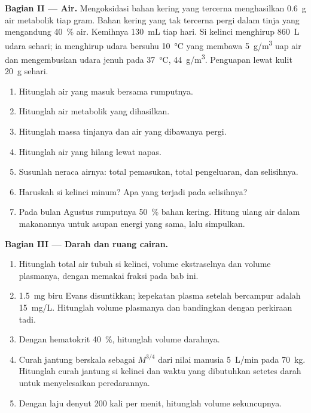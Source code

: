 \begin{problem}
\medskip
\noindent\textbf{Bagian II --- Air.}
Mengoksidasi bahan kering yang tercerna menghasilkan \qty{0.6}{g} air
metabolik tiap gram. Bahan kering yang tak tercerna pergi dalam tinja
yang mengandung \qty{40}{\%} air. Kemihnya \qty{130}{mL} tiap hari. Si
kelinci menghirup \qty{860}{L} udara sehari; ia menghirup udara
bersuhu \qty{10}{\celsius} yang membawa \qty{5}{g/m^3} uap air dan
mengembuskan udara jenuh pada \qty{37}{\celsius}, \qty{44}{g/m^3}.
Penguapan lewat kulit \qty{20}{g} sehari.
\begin{enumerate}[resume]
  \item Hitunglah air yang masuk bersama rumputnya.
  \item Hitunglah air metabolik yang dihasilkan.
  \item Hitunglah massa tinjanya dan air yang dibawanya pergi.
  \item Hitunglah air yang hilang lewat napas.
  \item Susunlah neraca airnya: total pemasukan, total pengeluaran, dan
        selisihnya.
  \item Haruskah si kelinci minum? Apa yang terjadi pada selisihnya?
  \item Pada bulan Agustus rumputnya \qty{50}{\%} bahan kering.
        Hitung ulang air dalam makanannya untuk asupan energi yang
        sama, lalu simpulkan.
\end{enumerate}

\medskip
\noindent\textbf{Bagian III --- Darah dan ruang cairan.}
\begin{enumerate}[resume]
  \item Hitunglah total air tubuh si kelinci, volume ekstraselnya dan
        volume plasmanya, dengan memakai fraksi pada bab ini.
  \item \qty{1.5}{mg} biru Evans disuntikkan; kepekatan plasma setelah
        bercampur adalah \qty{15}{mg/L}. Hitunglah volume plasmanya dan
        bandingkan dengan perkiraan tadi.
  \item Dengan hematokrit \qty{40}{\%}, hitunglah volume darahnya.
  \item Curah jantung berskala sebagai $M^{3/4}$ dari nilai manusia
        \qty{5}{L/min} pada \qty{70}{kg}. Hitunglah curah jantung si
        kelinci dan waktu yang dibutuhkan setetes darah untuk
        menyelesaikan peredarannya.
  \item Dengan laju denyut \qty{200}{} kali per menit, hitunglah volume
        sekuncupnya.
\end{enumerate}


\end{problem}
